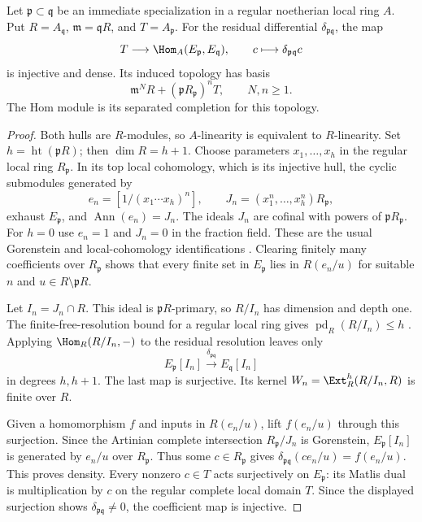 \begin{proposition}\label{i:adjacent}
Let $\mathfrak p\subset\mathfrak q$ be an immediate specialization
in a regular noetherian local ring $A$. Put $R=A_{\mathfrak q}$,
$\mathfrak m=\mathfrak qR$, and $T=\widehat{A_{\mathfrak p}}$.
For the residual differential $\delta_{\mathfrak p\mathfrak q}$,
the map
\[
 T\longrightarrow\Hom_A(E_{\mathfrak p},E_{\mathfrak q}),
 \qquad c\longmapsto\delta_{\mathfrak p\mathfrak q}c
\]
is injective and dense. Its induced topology has basis
\[
 \mathfrak m^N R+(\mathfrak pR_{\mathfrak p})^n T,
 \qquad N,n\geq1.
\]
The Hom module is its separated completion for this topology.
\end{proposition}
\begin{proof}
Both hulls are $R$-modules, so $A$-linearity is equivalent to
$R$-linearity. Set $h=\operatorname{ht}(\mathfrak pR)$; then
$\dim R=h+1$. Choose parameters $x_1,\ldots,x_h$ in the regular
local ring $R_{\mathfrak p}$. In its top local cohomology,
which is its injective hull, the cyclic submodules generated by
\[
 e_n=[1/(x_1\cdots x_h)^n],\qquad
 J_n=(x_1^n,\ldots,x_h^n)R_{\mathfrak p},
\]
exhaust $E_{\mathfrak p}$, and $\operatorname{Ann}(e_n)=J_n$.
The ideals $J_n$ are cofinal with powers of $\mathfrak pR_{\mathfrak p}$.
For $h=0$ use $e_n=1$ and $J_n=0$ in the fraction field.
These are the usual Gorenstein and local-cohomology identifications
\cite[Lemmas 47.21.3, 47.21.7, and proof of 47.21.10]{StacksGorenstein}.
Clearing finitely many coefficients over $R_{\mathfrak p}$ shows
that every finite set in $E_{\mathfrak p}$ lies in
$R(e_n/u)$ for suitable $n$ and $u\in R\setminus\mathfrak pR$.

Let $I_n=J_n\cap R$. This ideal is $\mathfrak pR$-primary,
so $R/I_n$ has dimension and depth one. The finite-free-resolution
bound for a regular local ring gives
$\operatorname{pd}_R(R/I_n)\leq h$
\cite[Proposition 10.110.1]{StacksRegularResolution}.
Applying $\Hom_R(R/I_n,-)$ to the residual resolution leaves only
\[
 E_{\mathfrak p}[I_n]\xrightarrow{\delta_{\mathfrak p\mathfrak q}}
 E_{\mathfrak q}[I_n]
\]
in degrees $h,h+1$. The last map is surjective. Its kernel
$W_n=\Ext_R^h(R/I_n,R)$ is finite over $R$.

Given a homomorphism $f$ and inputs in $R(e_n/u)$, lift
$f(e_n/u)$ through this surjection. Since the Artinian complete
intersection $R_{\mathfrak p}/J_n$ is Gorenstein,
$E_{\mathfrak p}[I_n]$ is generated by $e_n/u$ over
$R_{\mathfrak p}$. Thus some $c\in R_{\mathfrak p}$ gives
$\delta_{\mathfrak p\mathfrak q}(ce_n/u)=f(e_n/u)$.
This proves density. Every nonzero $c\in T$ acts surjectively on
$E_{\mathfrak p}$: its Matlis dual is multiplication by $c$ on
the regular complete local domain $T$. Since the displayed
surjection shows $\delta_{\mathfrak p\mathfrak q}\ne0$, the
coefficient map is injective.


\end{proof}
